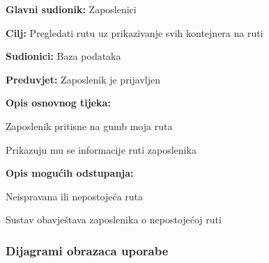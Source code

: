 			\noindent {}
			\begin{packed_item}
				
				\item \textbf{Glavni sudionik:} Zaposlenici
				\item  \textbf{Cilj:} Pregledati rutu uz prikazivanje svih kontejnera na ruti
				\item  \textbf{Sudionici:} Baza podataka
				\item  \textbf{Preduvjet:} Zaposlenik je prijavljen
				\item  \textbf{Opis osnovnog tijeka:}
				
				\item[] \begin{packed_enum}
					
					\item Zaposlenik pritisne na gumb moja ruta
					\item Prikazuju mu se informacije ruti zaposlenika
					
				\end{packed_enum}
				
				\item  \textbf{Opis mogućih odstupanja:}
				
				\item[] \begin{packed_item}
					
					\item[2.a] Neispravana ili nepostojeća ruta
					\item[] \begin{packed_enum}
						
						\item Sustav obavještava zaposlenika o nepostojećoj ruti

					\end{packed_enum}
					
				\end{packed_item}
			\end{packed_item}
			
			\clearpage
			\eject
			
			\subsubsection{Dijagrami obrazaca uporabe}
			
